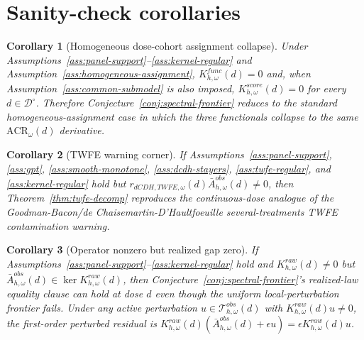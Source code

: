 \documentclass[11pt]{article}
\theoremstyle{definition}
\theoremstyle{plain}
\newtheorem{corollary}{Corollary}
\theoremstyle{remark}
\begin{document}
\section{Sanity-check corollaries}
\begin{corollary}[Homogeneous dose-cohort assignment collapse]\label{cor:homogeneous-collapse}
Under Assumptions~\ref{ass:panel-support}--\ref{ass:kernel-regular} and Assumption~\ref{ass:homogeneous-assignment}, \(K^{func}_{h,\omega}(d)=0\) and, when Assumption~\ref{ass:common-submodel} is also imposed, \(K^{score}_{h,\omega}(d)=0\) for every \(d\in\mathcal D^\circ\). Therefore Conjecture~\ref{conj:spectral-frontier} reduces to the standard homogeneous-assignment case in which the three functionals collapse to the same \(\mathrm{ACR}_\omega(d)\) derivative.
\end{corollary}

\begin{corollary}[TWFE warning corner]\label{cor:twfe-warning}
If Assumptions~\ref{ass:panel-support}, \ref{ass:gpt}, \ref{ass:smooth-monotone}, \ref{ass:dcdh-stayers}, \ref{ass:twfe-regular}, and \ref{ass:kernel-regular} hold but \(r_{dCDH,TWFE,\omega}(d)\bar A^{obs}_{h,\omega}(d)\neq 0\), then Theorem~\ref{thm:twfe-decomp} reproduces the continuous-dose analogue of the Goodman-Bacon/de Chaisemartin-D'Haultfoeuille several-treatments TWFE contamination warning.
\end{corollary}

\begin{corollary}[Operator nonzero but realized gap zero]\label{cor:null-vector}
If Assumptions~\ref{ass:panel-support}--\ref{ass:kernel-regular} hold and \(K^{raw}_{h,\omega}(d)\neq 0\) but \(\bar A^{obs}_{h,\omega}(d)\in\ker K^{raw}_{h,\omega}(d)\), then Conjecture~\ref{conj:spectral-frontier}'s realized-law equality clause can hold at dose \(d\) even though the uniform local-perturbation frontier fails. Under any active perturbation \(u\in\mathcal T^{obs}_{h,\omega}(d)\) with \(K^{raw}_{h,\omega}(d)u\neq0\), the first-order perturbed residual is \(K^{raw}_{h,\omega}(d)(\bar A^{obs}_{h,\omega}(d)+\epsilon u)=\epsilon K^{raw}_{h,\omega}(d)u\).
\end{corollary}
\end{document}
